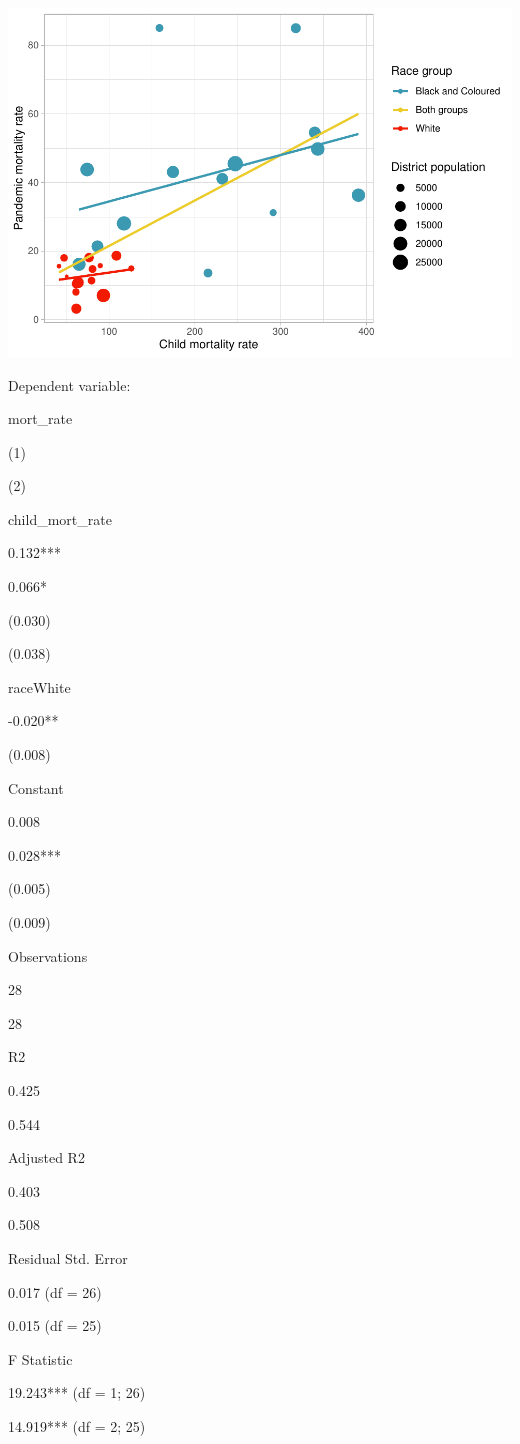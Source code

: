 \documentclass[fleqn,10pt,lineno]{wlpeerj} %
\begin{document}
\includegraphics{spanish-flu-mortality_bookdown_files/figure-latex/unnamed-chunk-14-1.pdf}

Dependent variable:

mort\_rate

(1)

(2)

child\_mort\_rate

0.132***

0.066*

(0.030)

(0.038)

raceWhite

-0.020**

(0.008)

Constant

0.008

0.028***

(0.005)

(0.009)

Observations

28

28

R2

0.425

0.544

Adjusted R2

0.403

0.508

Residual Std. Error

0.017 (df = 26)

0.015 (df = 25)

F Statistic

19.243*** (df = 1; 26)

14.919*** (df = 2; 25)
\end{document}
